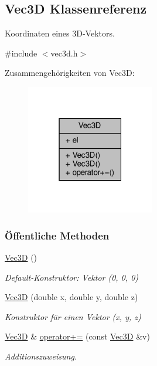 \hypertarget{classVec3D}{}\subsection{Vec3D Klassenreferenz}
\label{classVec3D}


Koordinaten eines 3\+D-\/\+Vektors.  




{\ttfamily \#include $<$vec3d.\+h$>$}



Zusammengehörigkeiten von Vec3D\+:
\nopagebreak
\begin{figure}[H]
\begin{center}
\leavevmode
\includegraphics[width=159pt]{classVec3D__coll__graph}
\end{center}
\end{figure}
\subsubsection*{Öffentliche Methoden}
\begin{DoxyCompactItemize}
\item 
\mbox{\hyperlink{classVec3D_a77e23de6cbc7c3853f8432a017df20b9}{Vec3D}} ()
\begin{DoxyCompactList}\small\item\em Default-\/\+Konstruktor\+: Vektor (0, 0, 0) \end{DoxyCompactList}\item 
\mbox{\hyperlink{classVec3D_ae51faecba7e72befc56d069d8cd1e3bf}{Vec3D}} (double x, double y, double z)
\begin{DoxyCompactList}\small\item\em Konstruktor für einen Vektor ({\ttfamily x}, {\ttfamily y}, {\ttfamily z}) \end{DoxyCompactList}\item 
\mbox{\hyperlink{classVec3D}{Vec3D}} \& \mbox{\hyperlink{classVec3D_a3de2f9c326c49353ee0510e49bd3f2c0}{operator+=}} (const \mbox{\hyperlink{classVec3D}{Vec3D}} \&v)
\begin{DoxyCompactList}\small\item\em Additionszuweisung. \end{DoxyCompactList}\end{DoxyCompactItemize}
